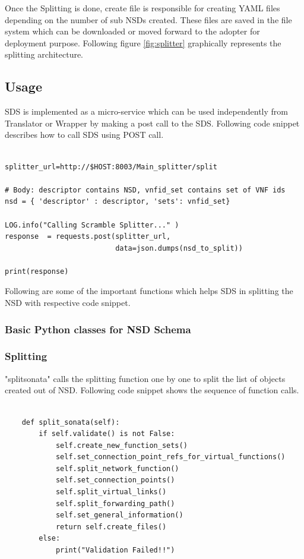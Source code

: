 Once the Splitting is done, create file is responsible for creating YAML files depending on the number of sub NSDs created. These files are saved in the file system which can be downloaded or moved forward to the adopter for deployment purpose. Following figure \ref{fig:splitter} graphically represents the splitting architecture.



\subsection{Usage}

SDS is implemented as a micro-service which can be used independently from Translator or Wrapper by making a post call to the SDS. Following code snippet describes how to call SDS using POST call.

\begin{lstlisting}[caption=POST call to SDS, label=lis:postSDS]

splitter_url=http://$HOST:8003/Main_splitter/split

# Body: descriptor contains NSD, vnfid_set contains set of VNF ids
nsd = { 'descriptor' : descriptor, 'sets': vnfid_set}

LOG.info("Calling Scramble Splitter..." )
response  = requests.post(splitter_url,
                          data=json.dumps(nsd_to_split))

print(response)

\end{lstlisting}

Following are some of the important functions which helps SDS in splitting the NSD with respective code snippet.

\subsubsection{Basic Python classes for NSD Schema}
\subsubsection{Splitting} "splitsonata" calls the splitting function one by one to split the list of objects created out of NSD. Following code snippet shows the sequence of function calls.

\begin{lstlisting}[caption=Sequence of function calls, label=lis:functioncalls]

    def split_sonata(self):
        if self.validate() is not False:
            self.create_new_function_sets()
            self.set_connection_point_refs_for_virtual_functions()
            self.split_network_function()
            self.set_connection_points()
            self.split_virtual_links()
            self.split_forwarding_path()
            self.set_general_information()
            return self.create_files()
        else:
            print("Validation Failed!!")

\end{lstlisting}

